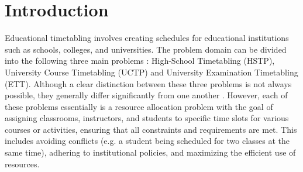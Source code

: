 \documentclass[sigconf]{acmart}
\begin{document}

\section{Introduction}
Educational timetabling involves creating schedules for educational
institutions such as schools, colleges, and universities.
The problem domain can be divided into the following three main problems
\cite{kingston2013educational,schaerf1999survey}:
High-School Timetabling (HSTP), University Course Timetabling (UCTP) and
University Examination Timetabling (ETT).
Although a clear distinction between these three problems is not always
possible, they generally differ significantly from one another
\cite{Beligiannis2009}.
However, each of these problems essentially is a resource allocation problem
with the goal of assigning classrooms, instructors, and students to specific
time slots for various courses or activities, ensuring that all constraints and
requirements are met.
This includes avoiding conflicts (e.g. a student being scheduled for two
classes at the same time), adhering to institutional policies, and maximizing
the efficient use of resources.
\end{document}
